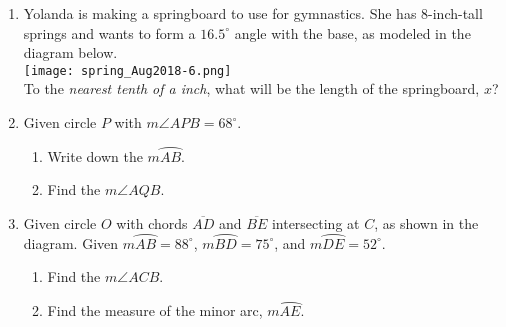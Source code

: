 \documentclass[12pt, twoside]{article}
\begin{document}
\begin{enumerate}
  \item Yolanda is making a springboard to use for gymnastics. She has 8-inch-tall springs and wants to form a $16.5^\circ$ angle with the base, as modeled in the diagram below.\\[0.3cm]
    \texttt{[image: spring\_Aug2018-6.png]}\\
  To the \emph{nearest tenth of a inch}, what will be the length of the springboard, $x$?
  \vspace{3.5cm}

\newpage

  \item Given circle $P$ with $m \angle APB=68^\circ$.
    \begin{multicols}{2}
     \raggedcolumns
     \begin{enumerate}
       \item Write down the $m \wideparen{AB}$. \vspace{1.7cm}
       \item Find the $m\angle AQB$. \vspace{2cm}
     \end{enumerate}
    \end{multicols} \vspace{1cm}

  \item Given circle $O$ with chords $\overline{AD}$ and $\overline{BE}$ intersecting at $C$, as shown in the diagram. Given $m \wideparen{AB}=88^\circ$, $m \wideparen{BD}=75^\circ$, and $m \wideparen{DE}=52^\circ$.
    \begin{multicols}{2}
     \raggedcolumns
     \begin{enumerate}
       \item Find the $m\angle ACB$. \vspace{3.5cm}
       \item Find the measure of the minor arc, $m\wideparen{AE}$. \vspace{2cm}
     \end{enumerate}
    \end{multicols}  \vspace{2cm}


\end{enumerate}
\end{document}
